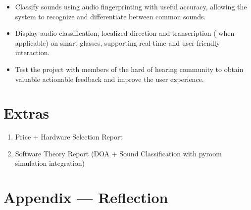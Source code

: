 \documentclass{article}
\begin{document}
\begin{itemize}
    \item Classify sounds using audio fingerprinting with useful accuracy,
    allowing the system to recognize and differentiate between common sounds.
    \item Display audio classification, localized direction and transcription (
    when applicable) on smart glasses, supporting real-time and user-friendly interaction.
    \item Test the project with members of the hard of hearing community to 
    obtain valuable actionable feedback and improve the user experience.
\end{itemize}
\section{Extras}

\begin{enumerate}
    \item Price + Hardware Selection Report
    \item Software Theory Report (DOA + Sound Classification with pyroom
        simulation integration)
\end{enumerate} 

\newpage{}

\section*{Appendix --- Reflection}
\end{document}

